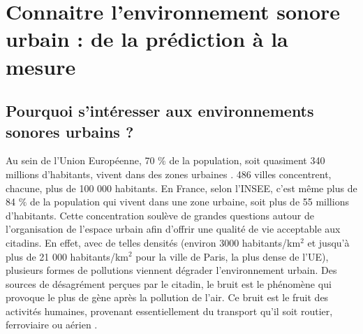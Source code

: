 %
%
%
%
%

\chapter{Connaitre l'environnement sonore urbain : de la prédiction à la mesure}
\thispagestyle{empty}

\section{Pourquoi s'intéresser aux environnements sonores urbains ?}

Au sein de l'Union Européenne, 70 $\%$ de la population, soit quasiment 340 millions d'habitants, vivent dans des zones urbaines \cite{europ-commission_data_2017}. 486 villes concentrent, chacune, plus de 100 000 habitants. En France, selon l'INSEE, c'est même plus de 84 $\%$ de la population qui vivent dans une zone urbaine, soit plus de 55 millions d'habitants. Cette concentration soulève de grandes questions autour de l'organisation de l'espace urbain afin d'offrir une qualité de vie acceptable aux citadins. En effet, avec de telles densités (environ 3000 habitants/km$^2$ et jusqu'à plus de 21 000  habitants/km$^2$ pour la ville de Paris, la plus dense de l'UE), plusieurs formes de pollutions viennent dégrader l'environnement urbain. Des sources de désagrément perçues par le citadin, le bruit est le phénomène qui provoque le plus de gène après la pollution de l'air. Ce bruit est le fruit des activités humaines, provenant essentiellement du transport qu'il soit routier, ferroviaire ou aérien \cite{zannin_characterization_2013}.\\


